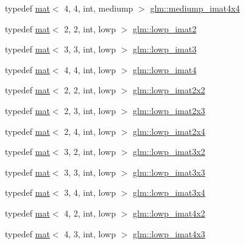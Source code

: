 \begin{DoxyCompactItemize}
\item 
typedef \hyperlink{structglm_1_1mat}{mat}$<$ 4, 4, int, mediump $>$ \hyperlink{group__gtc__matrix__integer_gaf45ac606a3fb21f46228524d1d322eb2}{glm\+::mediump\+\_\+imat4x4}
\item 
typedef \hyperlink{structglm_1_1mat}{mat}$<$ 2, 2, int, lowp $>$ \hyperlink{group__gtc__matrix__integer_gae4e37c11bd4e1d22eaf128792a7a0030}{glm\+::lowp\+\_\+imat2}
\item 
typedef \hyperlink{structglm_1_1mat}{mat}$<$ 3, 3, int, lowp $>$ \hyperlink{group__gtc__matrix__integer_gab66eef83170eea33b73938c19a82e4a0}{glm\+::lowp\+\_\+imat3}
\item 
typedef \hyperlink{structglm_1_1mat}{mat}$<$ 4, 4, int, lowp $>$ \hyperlink{group__gtc__matrix__integer_gaf6a884d14be360b41dc26d59cd732be7}{glm\+::lowp\+\_\+imat4}
\item 
typedef \hyperlink{structglm_1_1mat}{mat}$<$ 2, 2, int, lowp $>$ \hyperlink{group__gtc__matrix__integer_gab3548c407d85abacc0ee73eeb91169a0}{glm\+::lowp\+\_\+imat2x2}
\item 
typedef \hyperlink{structglm_1_1mat}{mat}$<$ 2, 3, int, lowp $>$ \hyperlink{group__gtc__matrix__integer_ga4b3b731b3f8ad88feee31e945c3618ca}{glm\+::lowp\+\_\+imat2x3}
\item 
typedef \hyperlink{structglm_1_1mat}{mat}$<$ 2, 4, int, lowp $>$ \hyperlink{group__gtc__matrix__integer_gabd8679c1108586fa89539a8bf029ad57}{glm\+::lowp\+\_\+imat2x4}
\item 
typedef \hyperlink{structglm_1_1mat}{mat}$<$ 3, 2, int, lowp $>$ \hyperlink{group__gtc__matrix__integer_ga96983291e90cfeaecde4409ef1ec74dd}{glm\+::lowp\+\_\+imat3x2}
\item 
typedef \hyperlink{structglm_1_1mat}{mat}$<$ 3, 3, int, lowp $>$ \hyperlink{group__gtc__matrix__integer_ga4bfcfb2b121f76d9bff2fb2e4017173a}{glm\+::lowp\+\_\+imat3x3}
\item 
typedef \hyperlink{structglm_1_1mat}{mat}$<$ 3, 4, int, lowp $>$ \hyperlink{group__gtc__matrix__integer_gacbdf7f35076058e4e9be49955ab3fbd3}{glm\+::lowp\+\_\+imat3x4}
\item 
typedef \hyperlink{structglm_1_1mat}{mat}$<$ 4, 2, int, lowp $>$ \hyperlink{group__gtc__matrix__integer_gad0e232eab19300176c21b9bc1bd7d247}{glm\+::lowp\+\_\+imat4x2}
\item 
typedef \hyperlink{structglm_1_1mat}{mat}$<$ 4, 3, int, lowp $>$ \hyperlink{group__gtc__matrix__integer_gad4b823d8b8ba89d8d6baa562ffb97751}{glm\+::lowp\+\_\+imat4x3}
\item 

\end{DoxyCompactItemize}
